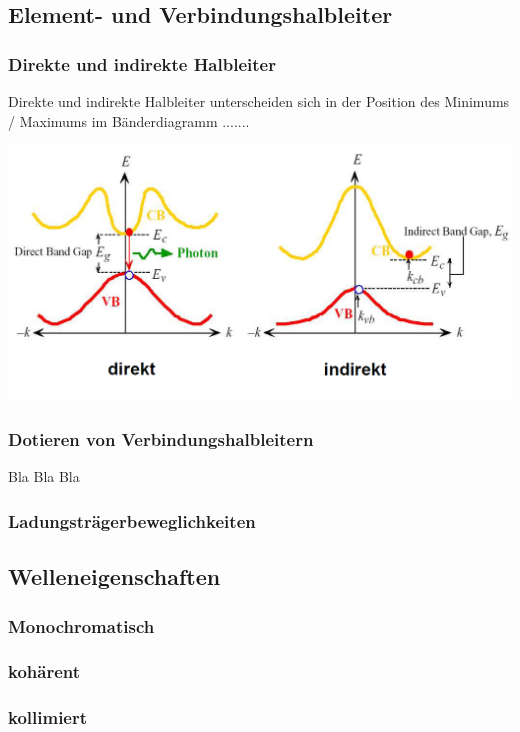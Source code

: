 \subsection{Element- und Verbindungshalbleiter}
	\subsubsection{Direkte und indirekte Halbleiter}
	Direkte und indirekte Halbleiter unterscheiden sich in der Position des Minimums / Maximums im Bänderdiagramm .......
	
		\includegraphics[width=\linewidth]{Kapitel/Kap11/direkte_indirekte_halbleiter.PNG}
	
	\subsubsection{Dotieren von Verbindungshalbleitern}
	
	 Bla Bla Bla
	\subsubsection{Ladungsträgerbeweglichkeiten}
\subsection{Welleneigenschaften}
	\subsubsection{Monochromatisch} 
	\subsubsection{kohärent} \subsubsection{kollimiert}
